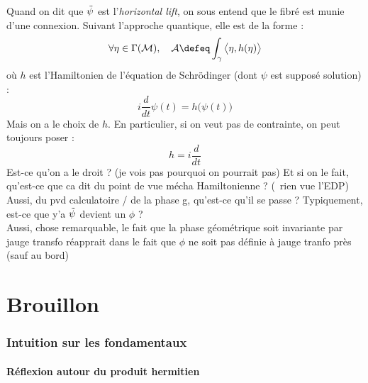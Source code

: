 Quand on dit que $\Tilde{\psi}$ est l'\textit{horizontal lift}, on sous entend que le fibré est munie d'une connexion. Suivant l'approche quantique, elle est de la forme :
\[\forall \eta\in\Gamma(\mathcal{M}),\quad  \mathcal{A} \defeq \int_\gamma \big\langle \eta, h(\eta) \big\rangle\]
où $h$ est l'Hamiltonien de l'équation de Schrödinger (dont $\psi$ est supposé solution) :
\begin{equation}\label{eq:schrodinger}
	i\frac{d}{dt} \psi(t) = h\big(\psi(t)\big)
\end{equation}
Mais on a le choix de $h$. En particulier, si on veut pas de contrainte, on peut toujours poser :
\[h = i\frac{d}{dt}\]
Est-ce qu'on a le droit ? (je vois pas pourquoi on pourrait pas) Et si on le fait, qu'est-ce que ca dit du point de vue mécha Hamiltonienne ? (\apriori~rien vue l'EDP)
\\
Aussi, du pvd calculatoire / de la phase g, qu'est-ce qu'il se passe ? Typiquement, est-ce que y'a $\Tilde{\psi}$ devient un $\phi$ ?
\\

Aussi, chose remarquable, le fait que la phase géométrique soit invariante par jauge transfo réapprait dans le fait que $\phi$ ne soit pas définie à jauge tranfo près (sauf au bord)





\setcounter{figure}{0}
\setcounter{lstlisting}{0}

\part{Brouillon}

\section{Intuition sur les fondamentaux}

\subsection{Réflexion autour du produit hermitien}

